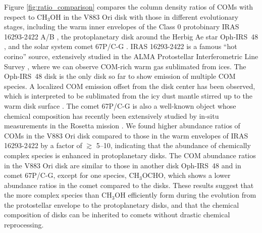 \documentclass[linenumbers, twocolumn, twocolappendix, astrosymb, times]{aastex631}
\newcommand{\methanol}{CH$_3$OH\xspace}
\newcommand{\methylformate}{CH$_3$OCHO\xspace}
\begin{document}
Figure \ref{fig:ratio_comparison} compares the column density ratios of COMs with respect to \methanol in the V883 Ori disk with those in different evolutionary stages, including the warm inner envelopes of the Class 0 protobinary IRAS 16293-2422 A/B \citep[][see also \citealt{Drozdovskaya2019}]{Lykke2017, Jorgensen2018, Manigand2020, Manigand2021}, the protoplanetary disk around the Herbig Ae star Oph-IRS~48 \citep{Brunken2022}, and the solar system comet 67P/C-G \citep[][see also \citealt{Drozdovskaya2019}]{Rubin2019, Schuhmann2019}. IRAS 16293-2422 is a famous ``hot corino'' source, extensively studied in the ALMA Protostellar Interferometric Line Survey \citep[PILS;][]{Jorgensen2016}, where we can observe COM-rich warm gas sublimated from ices. The Oph-IRS~48 disk is the only disk so far to show emission of multiple COM species. A localized COM emission offset from the disk center has been observed, which is interpreted to be sublimated from the icy dust mantle stirred up to the warm disk surface \citep{vanderMarel2021, Brunken2022}. The comet 67P/C-G is also a well-known object whose chemical composition has recently been extensively studied by in-situ measurements in the Rosetta mission \citep[e.g.,][]{Altwegg2019}. We found higher abundance ratios of COMs in the V883 Ori disk compared to those in the warm envelopes of IRAS 16293-2422 by a factor of $\gtrsim$ 5--10, indicating that the abundance of chemically complex species is enhanced in protoplanetary disks. The COM abundance ratios in the V883 Ori disk are similar to those in another disk Oph-IRS~48 and in comet 67P/C-G, except for one species, \methylformate, which shows a lower abundance ratios in the comet compared to the disks. These results suggest that the more complex species than \methanol efficiently form during the evolution from the protostellar envelope to the protoplanetary disks, and that the chemical composition of disks can be inherited to comets without drastic chemical reprocessing. 
\end{document}
